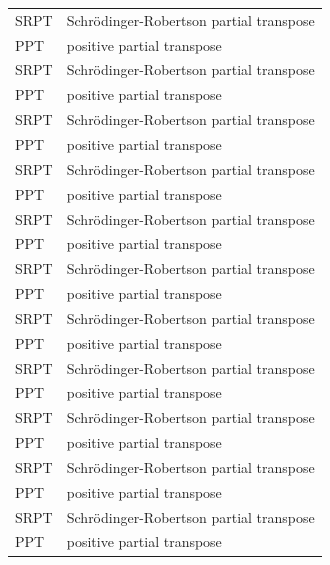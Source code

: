 \begin{longtable}{l p{}}
    SRPT & Schr\"odinger-Robertson partial transpose \\
    PPT  & positive partial transpose                \\
    SRPT & Schr\"odinger-Robertson partial transpose \\
    PPT  & positive partial transpose                \\
    SRPT & Schr\"odinger-Robertson partial transpose \\
    PPT  & positive partial transpose                \\
    SRPT & Schr\"odinger-Robertson partial transpose \\
    PPT  & positive partial transpose                \\
    SRPT & Schr\"odinger-Robertson partial transpose \\
    PPT  & positive partial transpose                \\
    SRPT & Schr\"odinger-Robertson partial transpose \\
    PPT  & positive partial transpose                \\
    SRPT & Schr\"odinger-Robertson partial transpose \\
    PPT  & positive partial transpose                \\
    SRPT & Schr\"odinger-Robertson partial transpose \\
    PPT  & positive partial transpose                \\
    SRPT & Schr\"odinger-Robertson partial transpose \\
    PPT  & positive partial transpose                \\
    SRPT & Schr\"odinger-Robertson partial transpose \\
    PPT  & positive partial transpose                \\
    SRPT & Schr\"odinger-Robertson partial transpose \\
    PPT  & positive partial transpose
\end{longtable}
